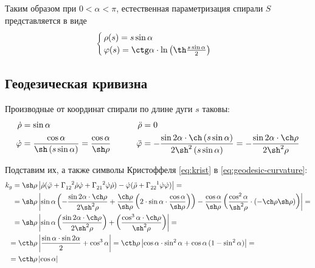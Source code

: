\documentclass{article}
\numberwithin{equation}{section}
\renewcommand{\phi}{\varphi}
\newcommand{\krist}[3]{\Gamma^{\phantom{#1 #2}#3}_{#1 #2}}
\providecommand{\abs}[1]{\left \lvert{#1}\right \rvert}
\begin{document}
Таким образом при $0 < \alpha < \pi$, естественная параметризация
спирали $S$ представляется в виде
\begin{equation}
  \begin{cases}
    \rho(s) = s \sin\alpha\\
    \phi(s) = \ctg\alpha\cdot\ln\left(\th\frac{s \sin\alpha}{2}\right)
  \end{cases}
\end{equation}

\subsection{Геодезическая кривизна}
Производные от координат спирали по длине дуги $s$ таковы:
\begin{align*}
  \dot{\rho} &= \sin\alpha &\qquad \ddot{\rho} &= 0 \\
  \dot{\phi} &= \frac{\cos\alpha}{\sh\left(s \sin\alpha\right)} = \frac{\cos\alpha}{\sh\rho} &\qquad
  \ddot{\phi} &= -\frac{\sin{2\alpha} \cdot \ch\left(s \sin\alpha\right)}
                      {2 \sh^2\left(s \sin\alpha\right)} =
                      -\frac{\sin{2\alpha} \cdot \ch\rho}{2 \sh^2\rho}
\end{align*}

Подставим их, а также символы Кристоффеля \eqref{eq:krist} в
\eqref{eq:geodesic-curvature}:
\begin{equation*}\label{eq:con-geo-curvature}
  \begin{split}
    k_g = \sh\rho& \abs{\dot\rho(\ddot\phi +
      \krist{1}{2}{2}\dot\rho\dot\phi +
      \krist{2}{1}{2}\dot\phi\dot\rho) -
      \dot\phi(\ddot\rho + \krist{2}{2}{1}\dot\phi\dot\phi)} =\\
    =\sh\rho& \abs{\sin\alpha\left(-\frac{\sin{2\alpha} \cdot
          \ch\rho}{2\sh^2\rho} +
        \frac{\ch\rho}{\sh\rho}\left(2\cdot\sin\alpha\cdot\frac{\cos\alpha}{\sh\rho}\right)\right)
      - \frac{\cos\alpha}{\sh\rho}
      \left(\frac{\cos^2\alpha}{\sh^2\rho}\cdot\left(-\ch\rho
          \sh\rho\right)\right)} =\\
    =\sh\rho&
    \abs{\sin\alpha\left(\frac{\sin{2\alpha}\cdot\ch\rho}{2\sh^2\rho}\right)
      + \left(\frac{\cos^3\alpha\cdot\ch\rho}{\sh^2\rho}\right)} =\\
    =\cth\rho&\abs{\frac{\sin\alpha\cdot\sin{2\alpha}}{2}+\cos^3\alpha}
    = \cth\rho\abs{\cos\alpha\cdot\sin^2\alpha+\cos\alpha\,(1-\sin^2\alpha)} =\\
    = \cth\rho&\abs{\cos\alpha}    
  \end{split}
\end{equation*}

\clearpage


\end{document}
